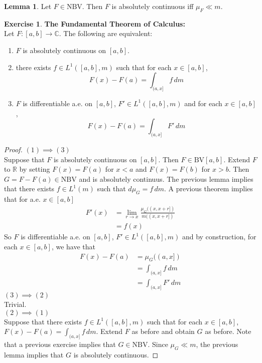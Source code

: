 \documentclass{book}
\theoremstyle{definition}
\newtheorem{lem}[definition]{Lemma}
\newtheorem{ex}[definition]{Exercise}
\newcommand{\C}{\mathbb{C}}
\newcommand{\R}{\mathbb{R}}
\newcommand{\lex}[1]{\label{ex:#1}}
\DeclareMathOperator*{\0}{\mbf{0}}
\DeclareMathOperator*{\1}{\mbf{1}}
\newcommand{\dm}{\, d m}
\newcommand{\BV}{\text{BV}}
\newcommand{\NBV}{\text{NBV}}
\begin{document}
	\begin{lem}
		Let $F \in \NBV$. Then $F$ is absolutely continuous iff $\mu_F \ll m$.
	\end{lem}
	
	\begin{ex} \lex{00000} \textbf{The Fundamental Theorem of Calculus:}\\
		Let $F:[a,b] \rightarrow \C$. The following are equivalent:
		\begin{enumerate}
			\item $F$ is absolutely continuous on $[a,b]$.
			\item there exists $f \in L^1([a,b], m)$ such that for each $x \in [a,b]$, 
			$$F(x)-F(a)= \int_{(a,x]}f\dm$$
			\item $F$ is differentiable a.e. on $[a,b]$, $F' \in L^1([a,b], m)$ and for each $x \in [a,b]$, 
			$$F(x)-F(a)=\int_{(a,x]}F'\dm$$
		\end{enumerate}
	\end{ex}
	
	\begin{proof}
		$(1) \implies (3)$ \\
		Suppose that $F$ is absolutely continuous on $[a,b]$. Then $F \in \BV[a,b]$. Extend $F$ to $\R$ by setting $F(x) = F(a)$ for $x<a$ and $F(x)=F(b)$ for $x>b$. Then $G=F-F(a) \in \NBV$ and is absolutely continuus. The previous lemma implies that there exists $f \in L^1(m)$ such that $d \mu_G = f\dm$. A previous theorem implies that for a.e. $x \in [a,b]$
		\begin{align*}
			F'(x) 
			&= \lim_{r \rightarrow x} \frac{\mu_G((x,x+r])}{m((x,x+r])}\\
			&= f(x)
		\end{align*}  
		So $F$ is differentiable a.e. on $[a,b]$, $F' \in L^1([a,b], m)$ and by construction, for each $x \in [a,b]$, we have that
		\begin{align*}
			F(x)-F(a)
			&= \mu_G((a,x])\\
			&= \int_{(a,x]}f\dm\\
			&= \int_{(a,x]}F'\dm
		\end{align*}
		$(3) \implies (2)$\\
		Trivial.\\
		$(2) \implies (1)$\\
		Suppose that there exists $f \in L^1([a,b], m)$ such that for each $x \in [a,b]$, $F(x)-F(a)=\int_{(a,x]}f\dm$. Extend $F$ as before and obtain $G$ as before. Note that a previous exercise implies that $G \in \NBV$. Since $\mu_G \ll m$, the previous lemma implies that $G$ is absolutely continuous.
	\end{proof}
	
\end{document}
